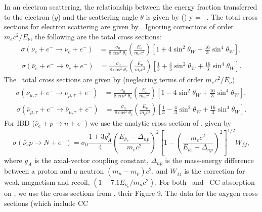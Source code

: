 In an electron scattering, the relationship between the energy fraction transferred to the
electron ($y$) and the scattering angle
$\theta$ is given by (\citealt{tomasetal2003})
%
\beq
 y = 
 ~. 
\eeq
%
The total cross sections for electron scattering are given by
\cite{marcianoparsa2003}.
 Ignoring corrections of order $m_ec^2/E_\nu$,  the following are the 
  total cross sections:
\begin{align}
\sigma (\nu_e + e^- \rightarrow \nu_e + e^-) &= \frac{\sigma_0}{8\cos^2{\theta_c}}\left(\frac{E_\nu}{m_ec^2}\right) [1+4\sin^2\theta_W + \frac{16}{3} \sin^4\theta_W],
\end{align}
\begin{align}
\sigma (\bar\nu_e + e^- \rightarrow \bar\nu_e + e^-)  &= \frac{\sigma_0}{8\cos^2{\theta_c}}\left(\frac{E_\nu}{m_ec^2}\right)[\frac13+\frac43\sin^2\theta_W + \frac{16}{3} \sin^4\theta_W].
\end{align}
The \nux\ total cross sections are given by (neglecting terms of
 order $m_ec^2/E_\nu$)
\begin{align}
\sigma (\nu_{\mu,\tau} + e^- \rightarrow \nu_{\mu,\tau} + e^-)  &= \frac{\sigma_0}{8\cos^2{\theta_c}}\left(\frac{E_\nu}{m_ec^2}\right) [1-4\sin^2\theta_W + \frac{16}{3} \sin^4\theta_W],
\end{align}
\begin{align}
\sigma (\bar\nu_{\mu,\tau} + e^- \rightarrow \bar\nu_{\mu,\tau} + e^-) &= \frac{\sigma_0}{8\cos^2{\theta_c}}\left(\frac{E_\nu}{m_ec^2}\right)[\frac13-\frac43\sin^2\theta_W + \frac{16}{3} \sin^4\theta_W].
\end{align}
For IBD ($\bar\nu_e + p \rightarrow n + e^-$)
we use the analytic cross section of \cite{burrowsetal2006}, given by
\begin{equation}
\label{eq:anuep}
\sigma({\bar\nu_e p \rightarrow N + e^-}) =
\sigma_0\frac{1+3g_A^2}{4}\left(\frac{E_{\bar\nu_e}-\Delta_{np}}{m_ec^2}\right)^2
\left[1-\left(\frac{m_ec^2}{E_{\bar\nu_e} - \Delta_{np}}\right)^2\right]^{1/2} W_{\overline{M}},
\end{equation}
where $g_A$ is the axial-vector coupling constant, $\Delta_{np}$ is the mass-energy difference between a
proton and a neutron $(m_n - m_p)c^2$, and
$W_{\overline{M}}$ 
is the correction for weak magnetism and
recoil, $(1-7.1 E_{\bar\nu_e}/m_nc^2)$.
For both \nue\ and \anue\ CC absorption on , 
we use the cross sections from \cite{kolbeetal2003}, their Figure 9.
The data for the oxygen cross sections (which include CC

